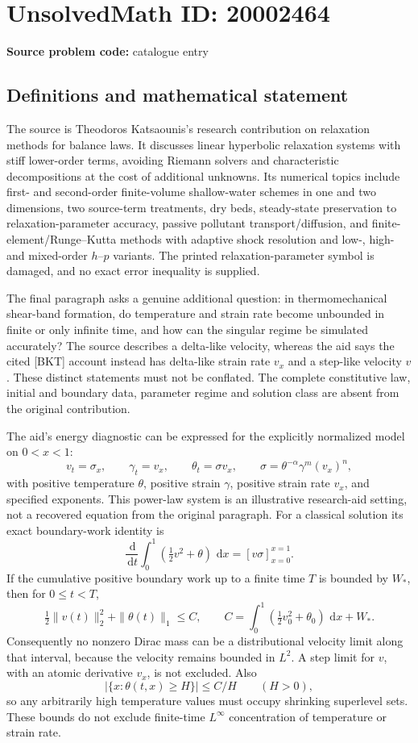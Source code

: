\documentclass[11pt]{article}
\newcommand{\dd}{\,\mathrm{d}}
\begin{document}
\section*{UnsolvedMath ID: 20002464}
\textbf{Source problem code:} catalogue entry
\subsection{Definitions and mathematical statement}
The source is Theodoros Katsaounis's research contribution on relaxation methods for balance laws. It discusses linear hyperbolic relaxation systems with stiff lower-order terms, avoiding Riemann solvers and characteristic decompositions at the cost of additional unknowns. Its numerical topics include first- and second-order finite-volume shallow-water schemes in one and two dimensions, two source-term treatments, dry beds, steady-state preservation to relaxation-parameter accuracy, passive pollutant transport/diffusion, and finite-element/Runge--Kutta methods with adaptive shock resolution and low-, high- and mixed-order $h$--$p$ variants. The printed relaxation-parameter symbol is damaged, and no exact error inequality is supplied.

The final paragraph asks a genuine additional question: in thermomechanical shear-band formation, do temperature and strain rate become unbounded in finite or only infinite time, and how can the singular regime be simulated accurately? The source describes a delta-like velocity, whereas the aid says the cited [BKT] account instead has delta-like strain rate $v_x$ and a step-like velocity $v$. These distinct statements must not be conflated. The complete constitutive law, initial and boundary data, parameter regime and solution class are absent from the original contribution.

The aid's energy diagnostic can be expressed for the explicitly normalized model on $0<x<1$:
\[
 v_t=\sigma_x,\qquad \gamma_t=v_x,
 \qquad\theta_t=\sigma v_x,\qquad
 \sigma=\theta^{-\alpha}\gamma^m(v_x)^n,
\]
with positive temperature $\theta$, positive strain $\gamma$, positive strain rate $v_x$, and specified exponents. This power-law system is an illustrative research-aid setting, not a recovered equation from the original paragraph. For a classical solution its exact boundary-work identity is
\[
 \frac{\dd}{\dd t}\int_0^1\left(\tfrac12v^2+\theta\right)\,\dd x
       =[v\sigma]_{x=0}^{x=1}.
\]
If the cumulative positive boundary work up to a finite time $T$ is bounded by $W_*$, then for $0\le t<T$,
\[
 \tfrac12\|v(t)\|_2^2+\|\theta(t)\|_1\le C,
 \qquad C=\int_0^1(\tfrac12v_0^2+\theta_0)\,\dd x+W_*.
\]
Consequently no nonzero Dirac mass can be a distributional velocity limit along that interval, because the velocity remains bounded in $L^2$. A step limit for $v$, with an atomic derivative $v_x$, is not excluded. Also
\[
 |\{x:\theta(t,x)\ge H\}|\le C/H\qquad(H>0),
\]
so any arbitrarily high temperature values must occupy shrinking superlevel sets. These bounds do not exclude finite-time $L^\infty$ concentration of temperature or strain rate.
\end{document}
